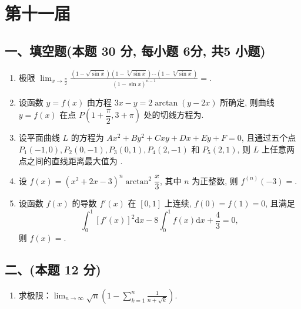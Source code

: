 \newpage
\section{第十一届}

\subsection*{一、填空题(本题 30 分,  每小题 6分,  共5 小题)}
\begin{enumerate}
    \item 极限 $\displaystyle\lim_{x \to \frac{\pi}{2}} \frac{(1 - \sqrt{\sin x})(1 - \sqrt[3]{\sin x}) \cdots (1 - \sqrt[n]{\sin x})}{(1 - \sin x)^{n-1}} =$\underline{\quad \quad}.
    \item 设函数 $y = f(x)$ 由方程 $3x - y = 2 \arctan(y - 2x)$ 所确定, 则曲线 $y = f(x)$ 在点 $P\left(1 + \dfrac{\pi}{2}, 3 + \pi\right)$ 处的切线方程为\underline{\quad \quad}.
    \item 设平面曲线 $L$ 的方程为 $Ax^2 + By^2 + Cxy + Dx + Ey + F = 0$, 且通过五个点 $P_1(-1, 0), P_2(0, -1), P_3(0, 1), P_4(2, -1)$ 和 $P_5(2, 1)$, 则 $L$ 上任意两点之间的直线距离最大值为 \underline{\quad \quad}.
    \item 设 $f(x) = (x^2 + 2x - 3)^n \arctan^2 \dfrac{x}{3}$, 其中 $n$ 为正整数, 则 $f^{(n)}(-3) =$\underline{\quad \quad}.
    \item 设函数 $f(x)$ 的导数 $f'(x)$ 在 $[0, 1]$ 上连续, $f(0) = f(1) = 0$, 且满足
          \[
              \int_{0}^{1} [f'(x)]^2 \mathrm{d}x - 8 \int_{0}^{1} f(x) \mathrm{d}x + \frac{4}{3} = 0,
          \]
          则 $f(x) =$\underline{\quad \quad}.
\end{enumerate}

\subsection*{二、(本题 12 分)}
\begin{enumerate}[start=6]
    \item 求极限：$\displaystyle\lim_{n \to \infty} \sqrt{n} \left( 1 - \sum_{k=1}^{n} \frac{1}{n + \sqrt{k}} \right)$.
\end{enumerate}


